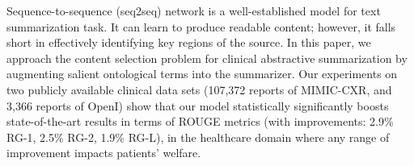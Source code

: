 Sequence-to-sequence (seq2seq) network is a well-established model for text summarization task. It can learn to produce readable content; however, it falls short in effectively identifying key regions of the source. In this paper, we approach the content selection problem for clinical abstractive summarization by augmenting salient ontological terms into the summarizer. Our experiments on two publicly available clinical data sets (107,372 reports of MIMIC-CXR, and 3,366 reports of OpenI) show that our model statistically significantly boosts state-of-the-art results in terms of ROUGE metrics (with improvements: 2.9\% RG-1, 2.5\% RG-2, 1.9\% RG-L), in the healthcare domain where any range of improvement impacts patients' welfare.
